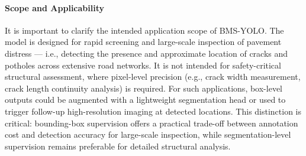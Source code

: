\documentclass[twocolumn]{sn-jnl}
\begin{document}
	\paragraph{Scope and Applicability}
	It is important to clarify the intended application scope of BMS-YOLO. The model is designed for rapid screening and large-scale inspection of pavement distress --- i.e., detecting the presence and approximate location of cracks and potholes across extensive road networks. It is not intended for safety-critical structural assessment, where pixel-level precision (e.g., crack width measurement, crack length continuity analysis) is required. For such applications, box-level outputs could be augmented with a lightweight segmentation head or used to trigger follow-up high-resolution imaging at detected locations. This distinction is critical: bounding-box supervision offers a practical trade-off between annotation cost and detection accuracy for large-scale inspection, while segmentation-level supervision remains preferable for detailed structural analysis.
	
\end{document}
